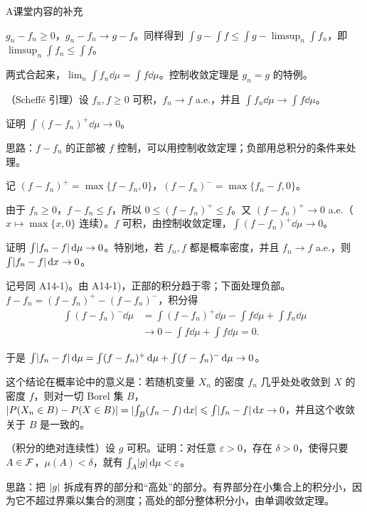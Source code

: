\begin{exercises}{A}{课堂内容的补充}
\begin{solution}
$g_n-f_n\geqslant0$，$g_n-f_n\to g-f$。同样得到 $\int g-\int f\leqslant\int g-\limsup_n\int f_n$，即 $\limsup_n\int f_n\leqslant\int f$。

两式合起来，$\lim_n\int f_n\dd\mu=\int f\dd\mu$。控制收敛定理是 $g_n=g$ 的特例。
\end{solution}

\item\label{ex:integration:A14} （Scheffé 引理）设 $f_n,f\geqslant0$ 可积，$f_n\to f$ a.e.，并且 $\int f_n\dd\mu\to\int f\dd\mu$。
\begin{questions}
\item 证明 $\int(f-f_n)^+\dd\mu\to0$。
\begin{solution}
思路：$f-f_n$ 的正部被 $f$ 控制，可以用控制收敛定理；负部用总积分的条件来处理。

记 $(f-f_n)^+=\max\{f-f_n,0\}$，$(f-f_n)^-=\max\{f_n-f,0\}$。

由于 $f_n\geqslant0$，$f-f_n\leqslant f$，所以 $0\leqslant(f-f_n)^+\leqslant f$。又 $(f-f_n)^+\to0$ a.e.（$x\mapsto\max\{x,0\}$ 连续）。$f$ 可积，由控制收敛定理，$\int(f-f_n)^+\dd\mu\to0$。
\end{solution}
\item 证明 $\int\lvert f_n-f\rvert\,\mathrm{d}\mu\to0$。特别地，若 $f_n,f$ 都是概率密度，并且 $f_n\to f$ a.e.，则 $\int\lvert f_n-f\rvert\,\mathrm{d} x\to0$。
\begin{solution}
记号同 A14-1)。由 A14-1)，正部的积分趋于零；下面处理负部。$f-f_n=(f-f_n)^+-(f-f_n)^-$，积分得
\[
\begin{aligned}
\int(f-f_n)^-\dd\mu&=\int(f-f_n)^+\dd\mu-\int f\dd\mu+\int f_n\dd\mu\\
&\to0-\int f\dd\mu+\int f\dd\mu=0 .
\end{aligned}
\]

于是 $\int\lvert f_n-f\rvert\,\mathrm{d}\mu=\int(f-f_n)^+\,\mathrm{d}\mu+\int(f-f_n)^-\,\mathrm{d}\mu\to0$。

这个结论在概率论中的意义是：若随机变量 $X_n$ 的密度 $f_n$ 几乎处处收敛到 $X$ 的密度 $f$，则对一切 Borel 集 $B$，$\lvert P(X_n\in B)-P(X\in B)\rvert=\lvert \int_B(f_n-f)\,\mathrm{d} x\rvert\leqslant\int\lvert f_n-f\rvert\,\mathrm{d} x\to0$，并且这个收敛关于 $B$ 是一致的。
\end{solution}
\end{questions}

\item\label{ex:integration:A15} （积分的绝对连续性）设 $g$ 可积。证明：对任意 $\varepsilon>0$，存在 $\delta>0$，使得只要 $A\in\mathcal{F}$，$\mu(A)<\delta$，就有 $\int_A\lvert g\rvert\,\mathrm{d}\mu<\varepsilon$。
\begin{solution}
思路：把 $\lvert g\rvert$ 拆成有界的部分和“高处”的部分。有界部分在小集合上的积分小，因为它不超过界乘以集合的测度；高处的部分整体积分小，由单调收敛定理。


\end{solution}
\end{exercises}
